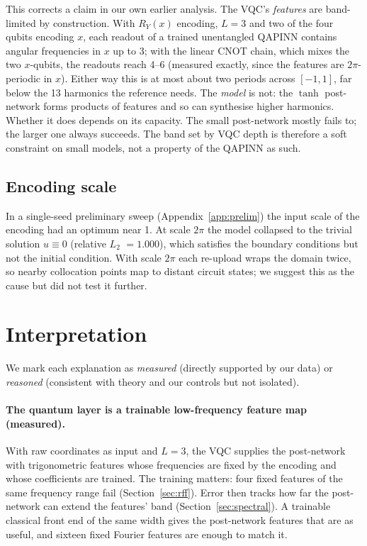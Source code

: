 \documentclass[11pt]{article}
\newcommand{\relL}{relative $L_2$}
\begin{document}
This corrects a claim in our own earlier analysis. The VQC's \emph{features} are
band-limited by construction. With $R_Y(x)$ encoding, $L=3$ and two of the four qubits
encoding $x$, each readout of a trained unentangled QAPINN contains angular frequencies
in $x$ up to 3; with the linear CNOT chain, which mixes the two $x$-qubits, the readouts
reach 4--6 (measured exactly, since the features are $2\pi$-periodic in $x$). Either way
this is at most about two periods across $[-1,1]$, far below the 13 harmonics the
reference needs. The
\emph{model} is not: the $\tanh$ post-network forms products of features and so can
synthesise higher harmonics. Whether it does depends on its capacity. The small
post-network mostly fails to; the larger one always succeeds. The band set by VQC depth
is therefore a soft constraint on small models, not a property of the QAPINN as such.

\subsection{Encoding scale}
In a single-seed preliminary sweep (Appendix~\ref{app:prelim}) the input scale of the
encoding had an optimum near 1. At scale $2\pi$ the model collapsed to the trivial
solution $u\equiv0$ (\relL{} $=1.000$), which satisfies the boundary conditions but not
the initial condition. With scale $2\pi$ each re-upload wraps the domain twice, so
nearby collocation points map to distant circuit states; we suggest this as the cause
but did not test it further.

\section{Interpretation}\label{sec:why}
We mark each explanation as \emph{measured} (directly supported by our data) or
\emph{reasoned} (consistent with theory and our controls but not isolated).

\paragraph{The quantum layer is a trainable low-frequency feature map (measured).} With
raw coordinates as input and $L=3$, the VQC supplies the post-network with trigonometric
features whose frequencies are fixed by the encoding and whose coefficients are trained.
The training matters: four fixed features of the same frequency range fail
(Section~\ref{sec:rff}). Error then tracks how far the post-network can extend the
features' band (Section~\ref{sec:spectral}). A trainable classical front end of the same
width gives the post-network features that are as useful, and sixteen fixed
Fourier features are enough to match it.
\end{document}
